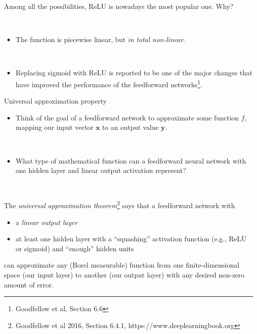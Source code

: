 \documentclass[
  10pt,
  ignorenonframetext,
]{beamer}
\providecommand{\tightlist}{%
  \setlength{\itemsep}{0pt}\setlength{\parskip}{0pt}}
\begin{document}
\begin{frame}
Among all the possibilities, ReLU is nowadays the most popular one. Why?

\(~\)

\begin{itemize}
\tightlist
\item
  The function is piecewise linear, but \emph{in total non-linear}.
\end{itemize}

\(~\)

\begin{itemize}
\tightlist
\item
  Replacing sigmoid with ReLU is reported to be one of the major changes
  that have improved the performance of the feedforward
  networks\footnote{Goodfellow et al, Section 6.6}.
\end{itemize}
\end{frame}

\begin{frame}
\begin{block}{Universal approximation property}
\protect\hypertarget{universal-approximation-property}{}
\(~\)

\begin{itemize}
\tightlist
\item
  Think of the goal of a feedforward network to approximate some
  function \(f\), mapping our input vector \({\boldsymbol x}\) to an
  output value \({\boldsymbol y}\).
\end{itemize}

\(~\)

\begin{itemize}
\tightlist
\item
  What type of mathematical function can a feedforward neural network
  with one hidden layer and linear output activation represent?
\end{itemize}

\(~\) \pause

The \emph{universal approximation
theorem}\footnote{Goodfellow et al 2016, Section 6.4.1, https://www.deeplearningbook.org}
says that a feedforward network with \vspace{2mm}

\begin{itemize}
\tightlist
\item
  a \emph{linear output layer}
\item
  at least one hidden layer with a ``squashing'' activation function
  (e.g., ReLU or sigmoid) and ``enough'' hidden units
\end{itemize}

\vspace{2mm}

can approximate any (Borel measurable) function from one
finite-dimensional space (our input layer) to another (our output layer)
with any desired non-zero amount of error.
\end{block}
\end{frame}
\end{document}
